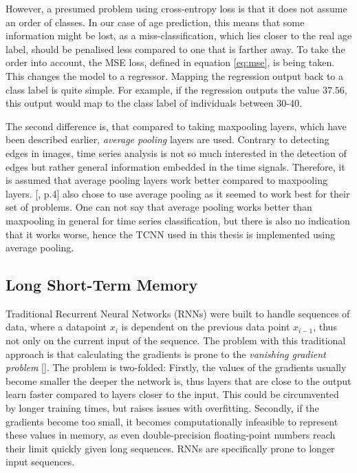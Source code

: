 \documentclass[11pt]{scrartcl}
\begin{document}
However, a presumed problem using cross-entropy loss is that it does not assume an order of classes. In our case of age prediction, this means that some information might be lost, as a miss-classification, which lies closer to the real age label, should be penalised less compared to one that is farther away. To take the order into account, the MSE loss, defined in equation \ref{eq:mse}, is being taken. This changes the model to a regressor. Mapping the regression output back to a class label is quite simple. For example, if the regression outputs the value $37.56$, this output would map to the class label of individuals between 30-40.

The second difference is, that compared to taking maxpooling layers, which have been described earlier, \textit{average pooling} layers are used. Contrary to detecting edges in images, time series analysis is not so much interested in the detection of edges but rather general information embedded in the time signals. Therefore, it is assumed that average pooling layers work better compared to maxpooling layers. [\cite{tcnn}, p.4] also chose to use average pooling as it seemed to work best for their set of problems. One can not say that average pooling works better than maxpooling in general for time series classification, but there is also no indication that it works worse, hence the TCNN used in this thesis is implemented using average pooling.

\subsection{Long Short-Term Memory}

Traditional Recurrent Neural Networks (RNNs) were built to handle sequences of data, where a datapoint $x_i$ is dependent on the previous data point $x_{i-1}$, thus not only on the current input of the sequence. The problem with this traditional approach is that calculating the gradients is prone to the \textit{vanishing gradient problem} [\cite{pascanu2012difficulty}]. The problem is two-folded: Firstly, the values of the gradients usually become smaller the deeper the network is, thus layers that are close to the output learn faster compared to layers closer to the input. This could be circumvented by longer training times, but raises issues with overfitting. Secondly, if the gradients become too small, it becomes computationally infeasible to represent these values in memory, as even double-precision floating-point numbers reach their limit quickly given long sequences. RNNs are specifically prone to longer input sequences.
\end{document}
